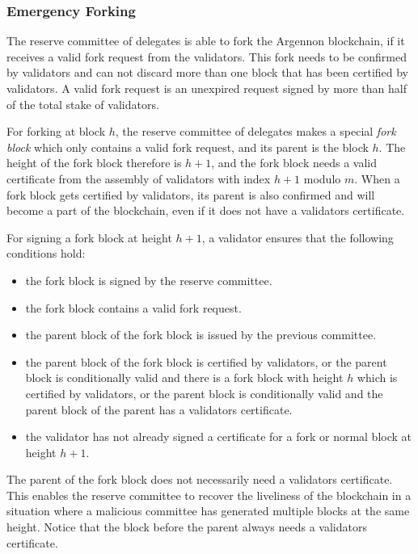 \subsubsection{Emergency Forking}

The reserve committee of delegates is able to fork the Argennon blockchain, if it receives a valid fork request
from the validators.
This fork needs to be confirmed by validators and can not discard more than one block that has been certified by
validators.
A valid fork request is an unexpired request signed by more than half of the total stake of validators.

For forking at block $h$, the reserve committee of delegates
makes a special \emph{fork block} which only contains a valid fork request, and its parent is the block $h$.
The height of the fork block therefore is $h + 1$, and the fork block needs a valid certificate from the assembly of
validators with index $h+1$ modulo $m$. When a
fork block gets certified by validators, its parent is also confirmed and will become a part of the blockchain, even if
it does not have a validators certificate.

For signing a fork block at height $h+1$, a validator ensures that the following conditions hold:
\begin{itemize}
    \item the fork block is signed by the reserve committee.
    \item the fork block contains a valid fork request.
    \item the parent block of the fork block is issued by the previous committee.
    \item the parent block of the fork block is certified by validators, or the parent block is conditionally
    valid and there is a fork block with height $h$ which is certified by validators, or the parent block is
    conditionally valid and the parent block of the parent has a validators certificate.
    \item the validator has not already signed a certificate for a fork or normal block at height $h+1$.
\end{itemize}

The parent of the fork block does not necessarily need a validators certificate. This enables the
reserve committee to recover the liveliness of the blockchain in a situation where a malicious committee has
generated multiple blocks at the same height. Notice that the block before the parent always needs a validators
certificate.

